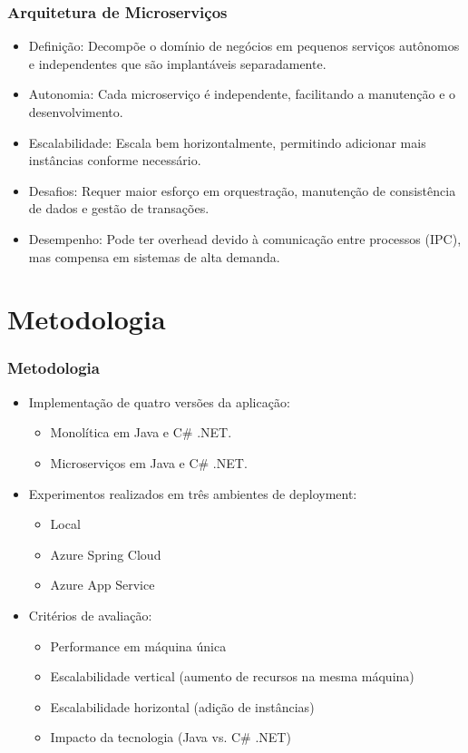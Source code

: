 \documentclass{beamer}
\begin{document}
\begin{frame}
\frametitle{Arquitetura de Microserviços}
\begin{itemize}
    \item Definição: Decompõe o domínio de negócios em pequenos serviços autônomos e independentes que são implantáveis separadamente.
    \item Autonomia: Cada microserviço é independente, facilitando a manutenção e o desenvolvimento.
    \item Escalabilidade: Escala bem horizontalmente, permitindo adicionar mais instâncias conforme necessário.
    \item Desafios: Requer maior esforço em orquestração, manutenção de consistência de dados e gestão de transações.
    \item Desempenho: Pode ter overhead devido à comunicação entre processos (IPC), mas compensa em sistemas de alta demanda.
\end{itemize}
\end{frame}

\section{Metodologia}

\begin{frame}
\frametitle{Metodologia}
\begin{itemize}
    \item Implementação de quatro versões da aplicação:
    \begin{itemize}
        \item Monolítica em Java e C\# .NET.
        \item Microserviços em Java e C\# .NET.
    \end{itemize}
    \item Experimentos realizados em três ambientes de deployment:
    \begin{itemize}
        \item Local
        \item Azure Spring Cloud
        \item Azure App Service
    \end{itemize}
    \item Critérios de avaliação:
    \begin{itemize}
        \item Performance em máquina única
        \item Escalabilidade vertical (aumento de recursos na mesma máquina)
        \item Escalabilidade horizontal (adição de instâncias)
        \item Impacto da tecnologia (Java vs. C\# .NET)
    \end{itemize}
\end{itemize}
\end{frame}
\end{document}
